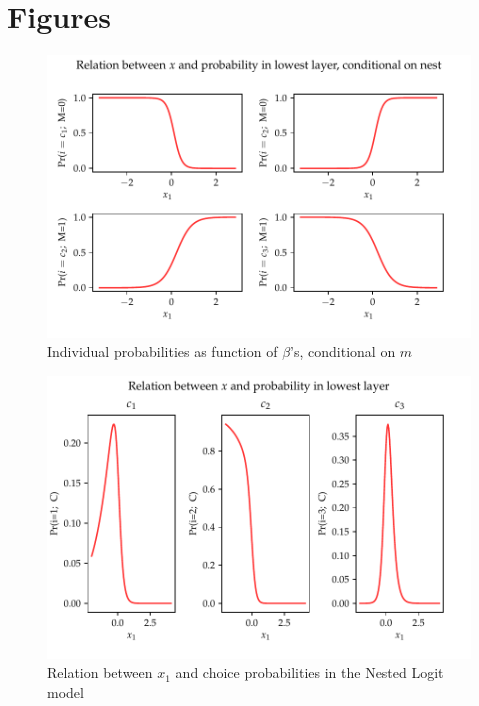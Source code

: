 
\section{Figures}

\begin{figure}[h]
  \begin{center}
    \centering\includegraphics[width=\linewidth]{03_figures/marginaleffects_on_M.pdf}
    \caption{Individual probabilities as function of $\beta$'s, conditional on $m$}
  \label{afig: marginalities}
\end{center}
\end{figure}



\begin{figure}[h]
  \begin{center}
    \centering\includegraphics[width=\linewidth]{03_figures/marginaleffects_NL.pdf}
    \caption{Relation between $x_1$ and choice probabilities in the Nested Logit model}
  \label{afig: nl_marginalities}
\end{center}
\end{figure}
